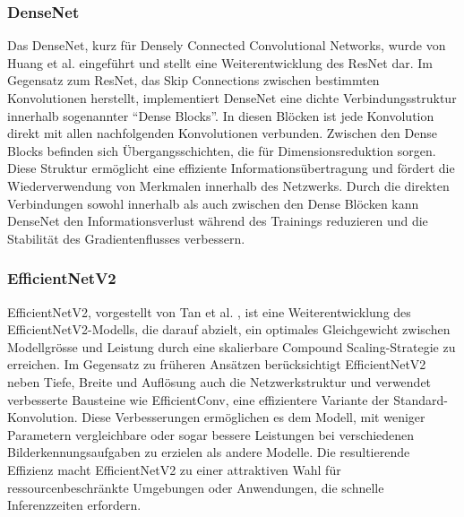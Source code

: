 \subsubsection{DenseNet}
Das DenseNet, kurz für Densely Connected Convolutional Networks, wurde von Huang et al. \cite{huang_densely_2018} eingeführt und stellt eine Weiterentwicklung des ResNet dar. Im Gegensatz zum ResNet, das Skip Connections zwischen bestimmten Konvolutionen herstellt, implementiert DenseNet eine dichte Verbindungsstruktur innerhalb sogenannter ``Dense Blocks''. In diesen Blöcken ist jede Konvolution direkt mit allen nachfolgenden Konvolutionen verbunden. Zwischen den Dense Blocks befinden sich Übergangsschichten, die für Dimensionsreduktion sorgen. Diese Struktur ermöglicht eine effiziente Informationsübertragung und fördert die Wiederverwendung von Merkmalen innerhalb des Netzwerks. Durch die direkten Verbindungen sowohl innerhalb als auch zwischen den Dense Blöcken kann DenseNet den Informationsverlust während des Trainings reduzieren und die Stabilität des Gradientenflusses verbessern.

\subsubsection{EfficientNetV2} 
EfficientNetV2, vorgestellt von Tan et al. \cite{tan_efficientnetv2_2021}, ist eine Weiterentwicklung des EfficientNetV2-Modells, die darauf abzielt, ein optimales Gleichgewicht zwischen Modellgrösse und Leistung durch eine skalierbare Compound Scaling-Strategie zu erreichen. Im Gegensatz zu früheren Ansätzen berücksichtigt EfficientNetV2 neben Tiefe, Breite und Auflösung auch die Netzwerkstruktur und verwendet verbesserte Bausteine wie EfficientConv, eine effizientere Variante der Standard-Konvolution. Diese Verbesserungen ermöglichen es dem Modell, mit weniger Parametern vergleichbare oder sogar bessere Leistungen bei verschiedenen Bilderkennungsaufgaben zu erzielen als andere Modelle. Die resultierende Effizienz macht EfficientNetV2 zu einer attraktiven Wahl für ressourcenbeschränkte Umgebungen oder Anwendungen, die schnelle Inferenzzeiten erfordern.
